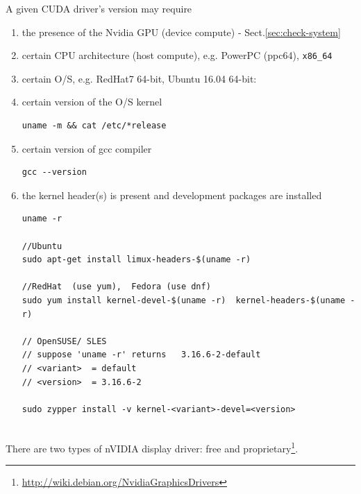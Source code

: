A given CUDA driver's version may require
\begin{enumerate}
   
  \item the presence of the Nvidia GPU (device compute) - Sect.\ref{sec:check-system}
  
  \item certain CPU architecture (host compute), e.g. PowerPC (ppc64), \verb!x86_64!
  
  \item certain  O/S, e.g. RedHat7 64-bit, Ubuntu 16.04 64-bit:
  
  \item certain version of the O/S kernel
  
\begin{verbatim}
uname -m && cat /etc/*release
\end{verbatim}  

   \item certain version of gcc compiler
   
\begin{verbatim}
gcc --version
\end{verbatim}

   \item the kernel header(s) is present and development packages are installed
   
\begin{verbatim}
uname -r

//Ubuntu
sudo apt-get install limux-headers-$(uname -r)

//RedHat  (use yum),  Fedora (use dnf)
sudo yum install kernel-devel-$(uname -r)  kernel-headers-$(uname -r)

// OpenSUSE/ SLES
// suppose 'uname -r' returns   3.16.6-2-default
// <variant>  = default
// <version>  = 3.16.6-2 

sudo zypper install -v kernel-<variant>-devel=<version>


\end{verbatim}

\end{enumerate}

There are two types of nVIDIA display driver: free and
proprietary\footnote{\url{http://wiki.debian.org/NvidiaGraphicsDrivers}}.

